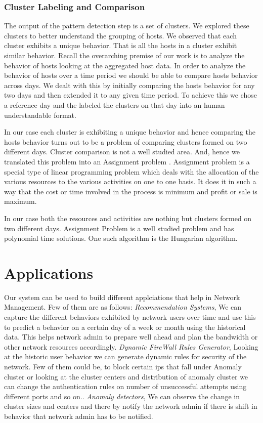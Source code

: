 \subsubsection{Cluster Labeling and Comparison}  \label{cluster_labeling}

The output of the pattern detection step is a set of clusters. We explored these clusters to better understand the grouping of hosts. We observed that each cluster exhibits a unique behavior. That is all the hosts in a cluster exhibit similar behavior.
Recall the overarching premise of our work is to analyze the behavior of hosts looking at the aggregated host data. In order to analyze the behavior of hosts over a time period we should be able to compare hosts behavior across days. We dealt with this by initially comparing the hosts behavior for any two days and then extended it to any given time period. To achieve this we chose a reference day and the labeled the clusters on that day into an human understandable format.


In our case each cluster is exhibiting a unique behavior and hence comparing the hosts behavior turns out to be a problem of comparing clusters formed on two different days. Cluster comparison is not a well studied area. And, hence we translated this problem into an Assignment problem \cite{kuhn1955hungarian}. Assignment problem is a special type of linear programming problem which deals with the allocation of the various resources to the various activities on one to one basis. It does it in such a way that the cost or time involved in the process is minimum and profit or sale is maximum. 

In our case both the resources and activities are nothing but clusters formed on two different days. Assignment Problem is a well studied problem and has polynomial time solutions. One such algorithm is the Hungarian algorithm. 

\section{Applications}
Our system can be used to build different applciations that help in Network Management. Few of them are as follows:
\textit{Recommendation Systems}, We can capture the different behaviors exhibited by network users over time and use this to predict a behavior on a certain day of a week or month using the historical data. This helps network admin to prepare well ahead and plan the bandwidth or other network resources accordingly.
\textit{Dynamic FireWall Rules Generator}, Looking at the historic user behavior we can generate dynamic rules for security of the network. Few of them could be, to block certain ips that fall under Anomaly cluster or looking at the cluster centers and distribution of anomaly cluster we can change the authentication rules on number of unsuccessful attempts using different ports and so on..
\textit{Anomaly detectors}, We can observe the change in cluster sizes and centers and there by notify the network admin if there is shift in behavior that network admin has to be notified. 




